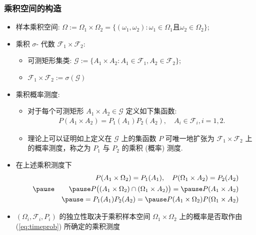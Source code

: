 \documentclass[Prob-All.tex]{subfiles}
\begin{document}
\begin{frame}
  \frametitle{乘积空间的构造}
  \begin{itemize}[<+-|alert@+>]
  \item 样本乘积空间: $\Omega:=\Omega_1\times \Omega_2=\{(\omega_1,\omega_2):\omega_1\in\Omega_1\mbox{且}\omega_2\in \Omega_2\}$;
  \item 乘积 $\sigma$- 代数 $\mathcal{F}_1\times\mathcal{F}_2$:
    \begin{itemize}[<+-|alert@+>]
    \item 可测矩形集类: $\mathcal{G}:=\{A_1\times A_2: A_1\in\mathcal{F}_1, A_2\in \mathcal{F}_2\}$;
    \item $\mathcal{F}_1\times \mathcal{F}_2:=\sigma(\mathcal{G})$
    \end{itemize}
  \item 乘积概率测度:
    \begin{itemize}[<+-|alert@+>]
    \item 对于每个可测矩形 $A_1\times A_2\in \mathcal{G}$ 定义如下集函数:
      \begin{eqnarray}\label{eq:timeprob}
        P(A_1\times A_2)=P_1(A_1)P_2(A_2), \quad A_i\in\mathcal{F}_i, i=1,2.
      \end{eqnarray}
    \item 理论上可以证明如上定义在 $\mathcal{G}$ 上的集函数 $P$ 可唯一地扩张为 $\mathcal{F}_1\times\mathcal{F}_2$ 上的概率测度，称之为 $P_1$ 与 $P_2$ 的乘积 (概率) 测度.
    \end{itemize}
  \item 在上述乘积测度下
    \begin{eqnarray*}
      &&P(A_1\times \Omega_2)=P_1(A_1), \quad P(\Omega_1\times A_2)=P_2(A_2)\\\pause
      &&\pause P\big((A_1\times \Omega_2)\cap (\Omega_1\times A_2)\big)=\pause P(A_1\times A_2)\\
      &&\pause = P_1(A_1)P_2(A_2)=\pause P(A_1\times\Omega_2)P(\Omega_1\times A_2)
    \end{eqnarray*}
  \item $(\Omega_i,\mathcal{F}_i,P_i)$ 的独立性取决于乘积样本空间 $\Omega_1\times\Omega_2$ 上的概率是否取作由 (\ref{eq:timeprob}) 所确定的乘积测度
  \end{itemize}
\end{frame}
\end{document}
